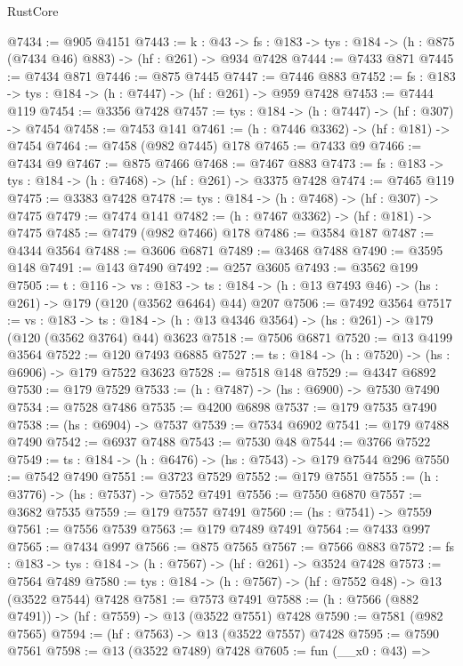 \begin{lexlean}{RustCore}
\begin{coremodule}
@7434 := @905 @4151
@7443 := {k : @43} ->
  {fs : @183} -> {tys : @184} -> (h : @875 (@7434 @46) @883) -> (hf : @261) -> @934 @7428
@7444 := @7433 @871
@7445 := @7434 @871
@7446 := @875 @7445
@7447 := @7446 @883
@7452 := {fs : @183} -> {tys : @184} -> (h : @7447) -> (hf : @261) -> @959 @7428
@7453 := @7444 @119
@7454 := @3356 @7428
@7457 := {tys : @184} -> (h : @7447) -> (hf : @307) -> @7454
@7458 := @7453 @141
@7461 := (h : @7446 @3362) -> (hf : @181) -> @7454
@7464 := @7458 (@982 @7445) @178
@7465 := @7433 @9
@7466 := @7434 @9
@7467 := @875 @7466
@7468 := @7467 @883
@7473 := {fs : @183} -> {tys : @184} -> (h : @7468) -> (hf : @261) -> @3375 @7428
@7474 := @7465 @119
@7475 := @3383 @7428
@7478 := {tys : @184} -> (h : @7468) -> (hf : @307) -> @7475
@7479 := @7474 @141
@7482 := (h : @7467 @3362) -> (hf : @181) -> @7475
@7485 := @7479 (@982 @7466) @178
@7486 := @3584 @187
@7487 := @4344 @3564
@7488 := @3606 @6871
@7489 := @3468 @7488
@7490 := @3595 @148
@7491 := @143 @7490
@7492 := @257 @3605
@7493 := @3562 @199
@7505 := {t : @116} ->
  {vs : @183} ->
  {ts : @184} -> (h : @13 @7493 @46) -> (hs : @261) -> @179 (@120 (@3562 @6464) @44) @207
@7506 := @7492 @3564
@7517 := {vs : @183} ->
  {ts : @184} -> (h : @13 @4346 @3564) -> (hs : @261) -> @179 (@120 (@3562 @3764) @44) @3623
@7518 := @7506 @6871
@7520 := @13 @4199 @3564
@7522 := @120 @7493 @6885
@7527 := {ts : @184} -> (h : @7520) -> (hs : @6906) -> @179 @7522 @3623
@7528 := @7518 @148
@7529 := @4347 @6892
@7530 := @179 @7529
@7533 := (h : @7487) -> (hs : @6900) -> @7530 @7490
@7534 := @7528 @7486
@7535 := @4200 @6898
@7537 := @179 @7535 @7490
@7538 := (hs : @6904) -> @7537
@7539 := @7534 @6902
@7541 := @179 @7488 @7490
@7542 := @6937 @7488
@7543 := @7530 @48
@7544 := @3766 @7522
@7549 := {ts : @184} -> (h : @6476) -> (hs : @7543) -> @179 @7544 @296
@7550 := @7542 @7490
@7551 := @3723 @7529
@7552 := @179 @7551
@7555 := (h : @3776) -> (hs : @7537) -> @7552 @7491
@7556 := @7550 @6870
@7557 := @3682 @7535
@7559 := @179 @7557 @7491
@7560 := (hs : @7541) -> @7559
@7561 := @7556 @7539
@7563 := @179 @7489 @7491
@7564 := @7433 @997
@7565 := @7434 @997
@7566 := @875 @7565
@7567 := @7566 @883
@7572 := {fs : @183} -> {tys : @184} -> (h : @7567) -> (hf : @261) -> @3524 @7428
@7573 := @7564 @7489
@7580 := {tys : @184} -> (h : @7567) -> (hf : @7552 @48) -> @13 (@3522 @7544) @7428
@7581 := @7573 @7491
@7588 := (h : @7566 (@882 @7491)) -> (hf : @7559) -> @13 (@3522 @7551) @7428
@7590 := @7581 (@982 @7565)
@7594 := (hf : @7563) -> @13 (@3522 @7557) @7428
@7595 := @7590 @7561
@7598 := @13 (@3522 @7489) @7428
@7605 := fun (__x0 : @43) =>

\end{coremodule}
\end{lexlean}
